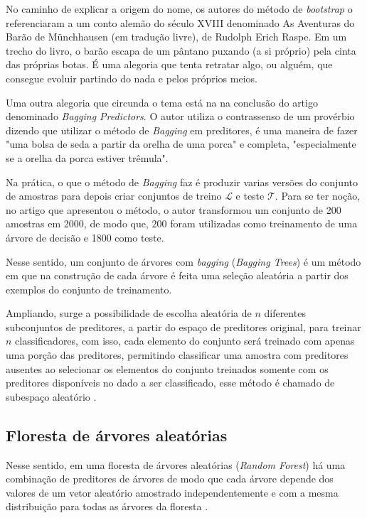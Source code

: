 \documentclass{article}
\begin{document}
No caminho de explicar a origem do nome, os autores do método de \textit{bootstrap} \cite{Efron_1993} o referenciaram a um conto alemão do século XVIII denominado As Aventuras do Barão de Münchhausen (em tradução livre), de Rudolph Erich Raspe. Em um trecho do livro, o barão escapa de um pântano puxando (a si próprio) pela cinta das próprias botas. É uma alegoria que tenta retratar algo, ou alguém, que consegue evoluir partindo do nada e pelos próprios meios.

Uma outra alegoria que circunda o tema está na na conclusão do artigo denominado \emph{Bagging Predictors}. O autor \cite{Breiman_1996} utiliza o contrassenso de um provérbio dizendo que utilizar o método de \emph{Bagging} em preditores, é uma maneira de fazer "uma bolsa de seda a partir da orelha de uma porca" e completa, "especialmente se a orelha da porca estiver trêmula". 

Na prática, o que o método de \emph{Bagging} faz é produzir varias versões do conjunto de amostras para depois criar conjuntos de treino $\mathcal{L}$ e teste $\mathcal{T}$. Para se ter noção, no artigo que apresentou o método, o autor transformou um conjunto de 200 amostras em 2000, de modo que, 200 foram utilizadas como treinamento de uma árvore de decisão e 1800 como teste.

Nesse sentido, um conjunto de árvores com \textit{bagging} (\textit{Bagging Trees}) é um método em que na construção de cada árvore é feita uma seleção aleatória a partir dos exemplos do conjunto de treinamento. 

Ampliando, surge a possibilidade de escolha aleatória de $n$ diferentes subconjuntos de preditores, a partir do espaço de preditores original, para treinar $n$ classificadores, com isso, cada elemento do conjunto será treinado com apenas uma porção das preditores, permitindo classificar uma amostra com preditores ausentes ao selecionar os elementos do conjunto treinados somente com os preditores disponíveis no dado a ser classificado, esse método é chamado de subespaço aleatório \cite{polikar2010}. 

\subsection{Floresta de árvores aleatórias}

Nesse sentido, em uma floresta de árvores aleatórias (\textit{Random Forest}) há uma combinação de preditores de árvores de modo que cada árvore depende dos valores de um vetor aleatório amostrado independentemente e com a mesma distribuição para todas as árvores da floresta \cite{Breiman_2001}.
\end{document}
